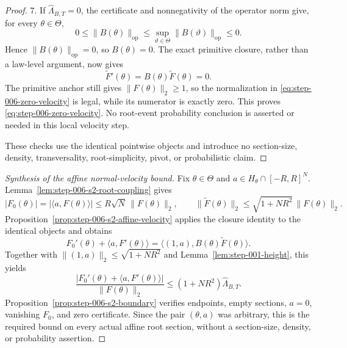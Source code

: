 \begin{proof}
7. If \(\widehat\Lambda_{B,T}=0\), the certificate and nonnegativity of the operator norm give, for
   every \(\theta\in\Theta\),
\begin{equation}
\label{eq:appendix-indented-003}
   0\leq\lVert B(\theta)\rVert_{\mathrm{op}}
   \leq\sup_{\vartheta\in\Theta}\lVert B(\vartheta)\rVert_{\mathrm{op}}
   \leq0.
\end{equation}
   Hence \(\lVert B(\theta)\rVert_{\mathrm{op}}=0\), so \(B(\theta)=0\). The exact primitive closure, rather
   than a law-level argument, now gives
\begin{equation}
\label{eq:appendix-indented-004}
   \widetilde F'(\theta)=B(\theta)\widetilde F(\theta)=0.
\end{equation}
   The primitive anchor still gives \(\lVert F(\theta)\rVert_2\geq1\), so
   the normalization in \eqref{eq:step-006-zero-velocity} is legal,
   while its numerator is exactly zero. This proves
   \eqref{eq:step-006-zero-velocity}. No root-event probability conclusion is asserted or
   needed in this local velocity step.

These checks use the identical pointwise objects and introduce no section-size, density, transversality,
root-simplicity, pivot, or probabilistic claim. 
\end{proof}


\begin{proof}[Synthesis of the affine normal-velocity bound]
Fix $\theta\in\Theta$ and $a\in H_\theta\cap[-R,R]^N$.
Lemma~\ref{lem:step-006-s2-root-coupling} gives
\begin{equation}
\label{eq:appendix-display-194}
|F_0(\theta)|=|\langle a,F(\theta)\rangle|
\leq R\sqrt N\,\|F(\theta)\|_2,
\qquad
\|\widetilde F(\theta)\|_2
\leq\sqrt{1+NR^2}\,\|F(\theta)\|_2.
\end{equation}
Proposition~\ref{prop:step-006-s2-affine-velocity} applies the closure
identity to the identical objects and obtains
\begin{equation}
\label{eq:appendix-display-195}
F_0'(\theta)+\langle a,F'(\theta)\rangle
=\langle(1,a),B(\theta)\widetilde F(\theta)\rangle.
\end{equation}
Together with $\|(1,a)\|_2\leq\sqrt{1+NR^2}$ and
Lemma~\ref{lem:step-001-height}, this yields
\begin{equation}
\label{eq:appendix-display-196}
\frac{|F_0'(\theta)+\langle a,F'(\theta)\rangle|}
{\|F(\theta)\|_2}
\leq(1+NR^2)\widehat\Lambda_{B,T}.
\end{equation}
Proposition~\ref{prop:step-006-s2-boundary} verifies endpoints, empty
sections, $a=0$, vanishing $F_0$, and zero certificate.  Since the pair
$(\theta,a)$ was arbitrary, this is the required bound on every actual affine
root section, without a section-size, density, or probability assertion.
\end{proof}

